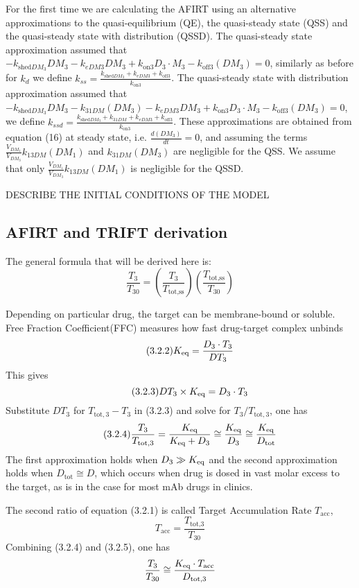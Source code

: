 For the first time we are calculating the AFIRT using an alternative approximations to the quasi-equilibrium (QE), the quasi-steady state (QSS) and the quasi-steady state with distribution (QSSD). The quasi-steady state approximation assumed that $-k_{\text{shed}DM_3}DM_3 - k_{eDM3}DM_3+k_{\text{on}3}D_3 \cdot M_3 - k_{\text{off}3}(DM_3) = 0 $, similarly as before for $k_d$ we define $k_{ss}=\frac{k_{\text{shed}DM_3} + k_{eDM3}+ k_{\text{off}3}}{k_{\text{on}3}}$. 
The quasi-steady state with distribution approximation assumed that $-k_{\text{shed}DM_3}DM_3-k_{31DM}(DM_3) - k_{eDM3}DM_3+k_{\text{on}3}D_3 \cdot M_3 - k_{\text{off}3}(DM_3) = 0 $, we define $k_{ssd}=\frac{k_{\text{shed}DM_3} +k_{31DM}+ k_{eDM3}+ k_{\text{off}3}}{k_{\text{on}3}}$. 
These approximations are obtained from equation (16) at steady state, i.e. $\frac{d(DM_3)}{dt}=0$, and assuming the terms $ \frac{V_{DM_1}}{V_{DM_3}}k_{13DM}(DM_1)$ and $ k_{31DM}(DM_3) $ are negligible for the QSS. We assume that only $\frac{V_{DM_1}}{V_{DM_3}}k_{13DM}(DM_1)$ is negligible for the QSSD.

DESCRIBE THE INITIAL CONDITIONS OF THE MODEL



\subsection{AFIRT and TRIFT derivation}




The general formula that will be derived here is:
\[\tag{3.2.1}
    \frac{T_3}{T_{30}}  = (\frac{T_3}{T_{\text{tot,ss}}})
                        (\frac{T_{\text{tot,ss}}}{T_{30}})
\] 


Depending on particular drug, the target can be membrane-bound or soluble.
Free Fraction Coefficient(FFC) measures how fast drug-target complex unbinds
\[\tag{3.2.2}
    K_\text{eq} = \frac{D_3\cdot T_3}{DT_3}
\]
This gives
\[\tag{3.2.3}
    DT_3\times K_\text{eq} = D_3\cdot T_3
\]
Substitute $DT_3$ for $T_{\text{tot},3} - T_3$ in (3.2.3) and solve
for $T_3/T_{\text{tot},3}$, one has
\[\tag{3.2.4}
    \frac{T_3}{T_{\text{tot},3}} = \frac{K_\text{eq}}{K_\text{eq} + D_3} 
    \cong \frac{K_\text{eq}}{D_3} \cong \frac{K_\text{eq}}{D_{\text{tot}}}
\]
The first approximation holds when $D_3 \gg K_\text{eq}$ and the second
approximation holds when $D_{\text{tot}} \cong D$, which occurs
when drug is dosed in vast molar excess to the target, as is in 
the case for most mAb drugs in clinics.

The second ratio of equation (3.2.1) is called 
Target Accumulation Rate $T_{\text{acc}}$,
\[\tag{3.2.5}
    T_{\text{acc}} = \frac{T_{\text{tot,3}}}{T_{30}}
\]
Combining (3.2.4) and (3.2.5), one has
\[
    \frac{T_3}{T_{30}} \cong 
    \frac{K_\text{eq}\cdot T_{\text{acc}}}{D_{\text{tot,3}}}
\]

